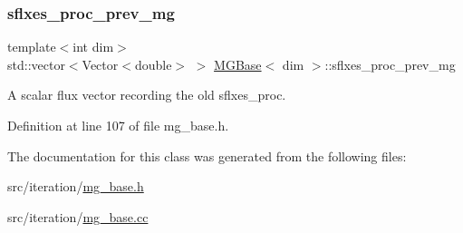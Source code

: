 \subsubsection{\texorpdfstring{sflxes\+\_\+proc\+\_\+prev\+\_\+mg}{sflxes\_proc\_prev\_mg}}
{\footnotesize\ttfamily template$<$int dim$>$ \\
std\+::vector$<$Vector$<$double$>$ $>$ \hyperlink{class_m_g_base}{M\+G\+Base}$<$ dim $>$\+::sflxes\+\_\+proc\+\_\+prev\+\_\+mg\hspace{0.3cm}{\ttfamily [protected]}}



A scalar flux vector recording the old sflxes\+\_\+proc. 



Definition at line 107 of file mg\+\_\+base.\+h.



The documentation for this class was generated from the following files\+:\begin{DoxyCompactItemize}
\item 
src/iteration/\hyperlink{mg__base_8h}{mg\+\_\+base.\+h}\item 
src/iteration/\hyperlink{mg__base_8cc}{mg\+\_\+base.\+cc}\end{DoxyCompactItemize}
